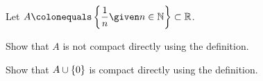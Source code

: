 \begin{problem}


  Let $\displaystyle A \colonequals \set{\frac{1}{n} \given n \in \N} \subset \R$.
  \begin{enumroman}
    \item Show that $A$ is not compact directly using the definition.
      \begin{answer}
        
      \end{answer}
    \item Show that $A \cup \left\{0\right\}$ is compact directly using the definition.
      \begin{answer}
        
      \end{answer}
  \end{enumroman}
\end{problem}
